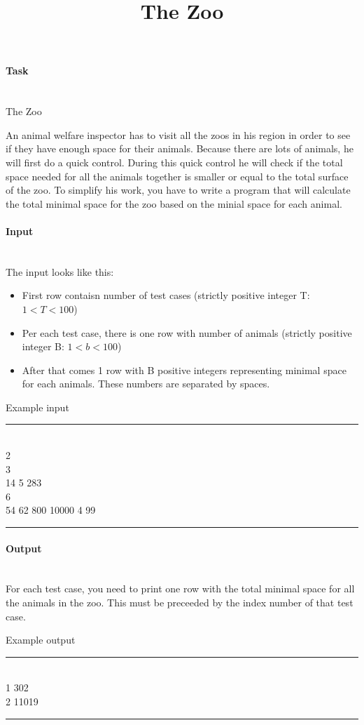 \documentclass[10pt,a4paper]{article}
\begin{document}
\title{The Zoo}
\maketitle

\paragraph{Task\\ \\}

The Zoo

An animal welfare inspector has to visit all the zoos in his region in order to see if they have enough space for their animals. 
Because there are lots of animals, he will first do a quick control. During this quick control he will check if the total space needed for all the animals together is smaller or equal to the total surface of the zoo. 
To simplify his work, you have to write a program that will calculate the total minimal space for the zoo based on the minial space for each animal.

\paragraph{Input\\ \\}

The input looks like this: \\
\begin{itemize}
	\item First row contaisn number of test cases (strictly positive integer T: $1 < T < 100$)
	\item Per each test case, there is one row with number of animals (strictly positive integer B: $1 < b < 100$)
	\item After that comes 1 row with B positive integers representing minimal space for each animals. These numbers are separated by spaces.
	
\end{itemize}

\begin{center}
Example input
\hrule
\end{center}
\mbox{}\\
2 \\
3 \\
14 5 283\\
6\\
54 62 800 10000 4 99\\
\hrule

	
\paragraph{Output\\ \\}

For each test case, you need to print one row with the total minimal space for all the animals in the zoo. This must be preceeded by the index number of that test case.


\begin{center}
Example output
\hrule
\end{center}
\mbox{} \\
1 302\\
2 11019\\
\hrule
\end{document}
